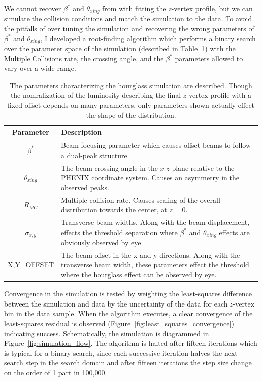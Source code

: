 We cannot recover $\beta^*$ and $\theta_{xing}$ from with fitting the $z$-vertex
profile, but we can simulate the collision conditions and match the simulation
to the data. To avoid the pitfalls of over tuning the simulation and recovering
the wrong parameters of $\beta^*$ and $\theta_{xing}$, I developed a
root-finding algorithm which performs a binary search over the parameter space
of the simulation (described in Table~\ref{tab:hourglass_simulation_parameters})
with the Multiple Collisions rate, the crossing angle, and the $\beta^*$
parameters allowed to vary over a wide range.  

\begin{table}[h]
  \centering
  \begin{tabular}{c p{10cm}}
    \toprule
    \textbf{Parameter} & \textbf{Description}\\
    \midrule
    $\beta^*$ & Beam focusing parameter which causes offset beams to follow a
    dual-peak structure \\
    $\theta_{xing}$ & The beam crossing angle in the $x$-$z$ plane relative to
    the PHENIX coordinate system. Causes an asymmetry in the observed peaks. \\
    $R_{MC}$ & Multiple collision rate. Causes scaling of the overall
    distribution towards the center, at $z=0$. \\
    $\sigma_{x,y}$ & Transverse beam widths. Along with the beam displacement,
    effects the threshold separation where $\beta^*$ and $\theta_{xing}$
    effects are obviously observed by eye \\
    {X,Y}\_OFFSET & The beam offset in the x and y directions. Along with the
    transverse beam width, these parameters effect the threshold where the
    hourglass effect can be observed by eye. \\
    \bottomrule
  \end{tabular}
  \caption{
    The parameters characterizing the hourglass simulation are described.
    Though the nomralization of the luminosity describing the final $z$-vertex
    profile with a fixed offset depends on many parameters, only parameters shown
    actually effect the shape of the distribution.
  }
  \label{tab:hourglass_simulation_parameters}
\end{table}

Convergence in the simulation is tested by weighting the least-squares
difference between the simulation and data by the uncertainty of the data for
each $z$-vertex bin in the data sample.  When the algorithm executes, a clear
convergence of the least-squares residual is observed
(Figure~\ref{fig:least_squares_convergence}) indicating success.  Schematically,
the simulation is diagrammed in Figure~\ref{fig:simulation_flow}.  The algorithm
is halted after fifteen iterations which is typical for a binary search, since
each successive iteration halves the next search step in the search domain and
after fifteen iterations the step size change on the order of 1 part in 100,000.

